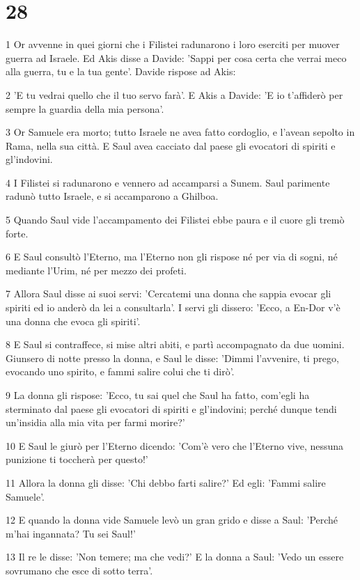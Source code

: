 \chapter{28}

\par 1 Or avvenne in quei giorni che i Filistei radunarono i loro eserciti per muover guerra ad Israele. Ed Akis disse a Davide: 'Sappi per cosa certa che verrai meco alla guerra, tu e la tua gente'. Davide rispose ad Akis:
\par 2 'E tu vedrai quello che il tuo servo farà'. E Akis a Davide: 'E io t'affiderò per sempre la guardia della mia persona'.
\par 3 Or Samuele era morto; tutto Israele ne avea fatto cordoglio, e l'avean sepolto in Rama, nella sua città. E Saul avea cacciato dal paese gli evocatori di spiriti e gl'indovini.
\par 4 I Filistei si radunarono e vennero ad accamparsi a Sunem. Saul parimente radunò tutto Israele, e si accamparono a Ghilboa.
\par 5 Quando Saul vide l'accampamento dei Filistei ebbe paura e il cuore gli tremò forte.
\par 6 E Saul consultò l'Eterno, ma l'Eterno non gli rispose né per via di sogni, né mediante l'Urim, né per mezzo dei profeti.
\par 7 Allora Saul disse ai suoi servi: 'Cercatemi una donna che sappia evocar gli spiriti ed io anderò da lei a consultarla'. I servi gli dissero: 'Ecco, a En-Dor v'è una donna che evoca gli spiriti'.
\par 8 E Saul si contraffece, si mise altri abiti, e partì accompagnato da due uomini. Giunsero di notte presso la donna, e Saul le disse: 'Dimmi l'avvenire, ti prego, evocando uno spirito, e fammi salire colui che ti dirò'.
\par 9 La donna gli rispose: 'Ecco, tu sai quel che Saul ha fatto, com'egli ha sterminato dal paese gli evocatori di spiriti e gl'indovini; perché dunque tendi un'insidia alla mia vita per farmi morire?'
\par 10 E Saul le giurò per l'Eterno dicendo: 'Com'è vero che l'Eterno vive, nessuna punizione ti toccherà per questo!'
\par 11 Allora la donna gli disse: 'Chi debbo farti salire?' Ed egli: 'Fammi salire Samuele'.
\par 12 E quando la donna vide Samuele levò un gran grido e disse a Saul: 'Perché m'hai ingannata? Tu sei Saul!'
\par 13 Il re le disse: 'Non temere; ma che vedi?' E la donna a Saul: 'Vedo un essere sovrumano che esce di sotto terra'.
